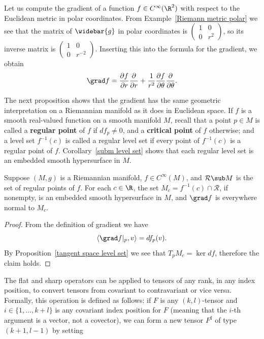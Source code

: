 \begin{example}
Let us compute the gradient of a function $f\in C^\infty(\R^2)$ with respect to the Euclidean metric in polar coordinates. From Example~\ref{Riemann metric polar} we see that the matrix of $\widebar{g}$ in polar coordinates is $(\begin{smallmatrix}
1&0\\
0&r^2
\end{smallmatrix})$, so its inverse matrix is $(\begin{smallmatrix}
1&0\\
0&r^{-2}
\end{smallmatrix})$.
Inserting this into the formula for the gradient, we obtain
\[\grad f=\frac{\partial f}{\partial r}\frac{\partial}{\partial r}+\frac{1}{r^2}\frac{\partial f}{\partial\theta}\frac{\partial}{\partial\theta}.\]
\end{example}
The next proposition shows that the gradient has the same geometric interpretation
on a Riemannian manifold as it does in Euclidean space. If $f$ is a smooth
real-valued function on a smooth manifold $M$, recall that a point $p\in M$ is 
called a \textbf{regular point} of $f$ if $df_p\neq 0$, and a \textbf{critical point} of $f$ 
otherwise; and a level set $f^{-1}(c)$ is called a regular level set if every point of 
$f^{-1}(c)$ is a regular point of $f$. Corollary~\ref{subm level set} shows that 
each regular level set is an embedded smooth hypersurface in $M$.
\begin{proposition}
Suppose $(M,g)$ is a Riemannian manifold, $f\in C^{\infty}(M)$, and $\mathcal{R}\sub M$ 
is the set of regular points of $f$. For each $c\in\R$, the set $M_c=f^{-1}(c)\cap\mathcal{R}$, 
if nonempty, is an embedded smooth hypersurface in $M$, and $\grad f$ is everywhere 
normal to $M_c$.
\end{proposition}
\begin{proof}
From the definition of gradient we have
\[\langle\grad f|_p,v\rangle=df_p(v).\]
By Proposition~\ref{tangent space level set} we see that $T_pM_c=\ker df$, therefore the claim holds.
\end{proof}
The flat and sharp operators can be applied to tensors of any rank, in any 
index position, to convert tensors from covariant to contravariant or 
vice versa. Formally, this operation is defined as follows: if $F$ is any 
$(k,l)$-tensor and $i\in\{1,\dots,k+l\}$ is any covariant index position 
for $F$ (meaning that the $i$-th argument is a vector, not a covector), we 
can form a new tensor $F^{\sharp}$ of type $(k+1,l-1)$ by setting
